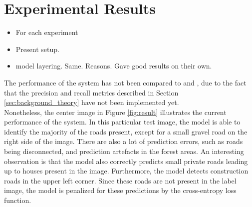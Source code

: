 \section{Experimental Results}
\label{sec:experimentalResults}
\begin{itemize}
\item For each experiment
\item Present setup.
\item model layering. Same. Reasons. Gave good results on their own.
\end{itemize}


The performance of the system has not been compared to \citep{saito_building_and_roads} and \citep{Mnih_aerial_images_noisy}, due to the fact that the precision and recall metrics described in Section \ref{sec:background_theory} have not been implemented yet.\\

Nonetheless, the center image in Figure \ref{fig:result} illustrates the current performance of the system. In this particular test image, the model is able to identify the majority of the roads present, except for a small gravel road on the right side of the image. There are also a lot of prediction errors, such as roads being disconnected, and prediction artefacts in the forest areas. An interesting observation is that the model also correctly predicts small private roads leading up to houses present in the image. Furthermore, the model detects construction roads in the upper left corner. Since these roads are not present in the label image, the model is penalized for these predictions by the cross-entropy loss function.\\


